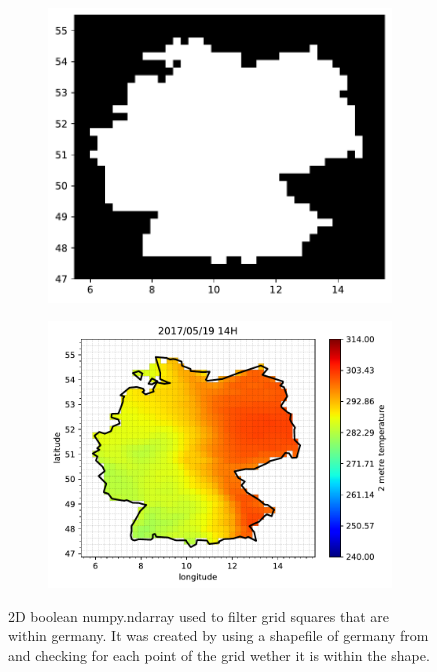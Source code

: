 \begin{figure}[h!]%
	\centering
	\begin{subfigure}{.5\textwidth}
		\centering
		\includegraphics[width=.85\textwidth]{plots/isinDE}%
		\label{fig:isinDE}%
	\end{subfigure}%
	\begin{subfigure}{.5\textwidth}
		\centering
		\includegraphics[width=1.1\textwidth]{plots/t2m/maxvar/0_map_isin}%
		\label{fig:t2m_maxvar_0_map_isin}%
	\end{subfigure}
	\caption[2D boolean numpy.ndarray used to filter grid squares that are within germany. It was created by using a shapefile of germany and checking for each point of the grid if it is within the shapefile.]{2D boolean numpy.ndarray used to filter grid squares that are within germany. It was created by using a shapefile of germany from  and checking for each point of the grid wether it is within the shape.}
	\label{fig:isin_compare}
\end{figure}

